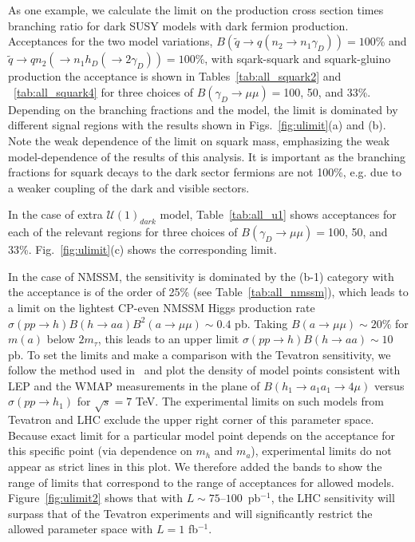 As one example, we calculate the limit on the production cross section times branching ratio for dark SUSY models with dark fermion production. Acceptances for the two model variations, $B(\tilde{q} \to q (n_2 \to n_1 \gamma_D))=100$\% and $\tilde{q} \to q n_2 (\to n_1 h_{D} (\to 2 \gamma_{D}))=100$\%, with  sqark-squark and squark-gluino production the acceptance is shown in Tables~\ref{tab:all_squark2} and ~\ref{tab:all_squark4} for three choices of 
$B(\gamma_D \to \mu \mu)=$100, 50, and 33\%. Depending on the branching fractions and the model, the limit is dominated by different signal regions with the results shown in Figs.~\ref{fig:ulimit}(a) and (b). Note the weak dependence of the limit on squark mass, emphasizing the weak model-dependence of the 
results of this analysis. It is important as the branching fractions for squark decays to the dark sector fermions are not 100\%, e.g. due to a 
weaker coupling of the dark and visible sectors.

In the case of extra $\mathcal{U}(1)_{dark}$ model, Table~\ref{tab:all_u1} shows acceptances for each of the relevant regions for three 
choices of $B(\gamma_D \to \mu \mu)=$100, 50, and 33\%. Fig.~\ref{fig:ulimit}(c) shows the corresponding limit.

In the case of NMSSM, the sensitivity is dominated by the (b-1) category with the acceptance is of the order of 25\% (see Table~\ref{tab:all_nmssm}), which leads to a limit on the lightest CP-even NMSSM Higgs production rate $\sigma(pp \to h) B(h \to aa) B^2(a \to \mu \mu)\sim 0.4$ pb. Taking $B(a \to \mu \mu) \sim 20\%$ for $m(a)$ below $2 m_\tau$, this leads to an upper limit $\sigma(pp \to h) B(h \to aa) \sim 10$ pb. To set the limits and make a comparison with the Tevatron sensitivity, we follow the method used in~\cite{Belyaev:nmssm} and plot the density of model points consistent with LEP and the WMAP measurements in the plane of $B(h_1 \to a_1 a_1 \to 4 \mu)$ versus $\sigma (pp \to h_1)$ for $\sqrt{s}=7$ TeV. The experimental limits on such models from Tevatron and LHC exclude the upper right corner of this parameter space. Because exact limit for a particular model point depends on the acceptance for this specific point (via dependence on $m_h$ and $m_a$), experimental limits do not appear as strict lines in this plot. We therefore added the bands to show the range of limits that correspond to the range of acceptances for allowed models. Figure~\ref{fig:ulimit2} shows that with $L \sim 75$--$100$~pb$^{-1}$, the LHC sensitivity will surpass that of the Tevatron experiments and will significantly restrict the allowed 
parameter space with $L=1$ fb$^{-1}$.

